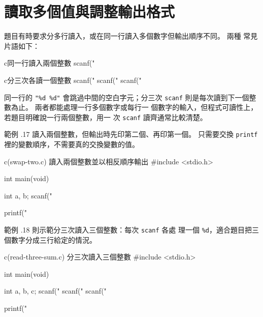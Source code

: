 \section{讀取多個值與調整輸出格式}
\label{sec:basic-multi-read}

題目有時要求分多行讀入，或在同一行讀入多個數字但輸出順序不同。 兩種
常見片語如下：

\begin{code}{c}{同一行讀入兩個整數}
scanf("%
\end{code}

\begin{code}{c}{分三次各讀一個整數}
scanf("%
scanf("%
scanf("%
\end{code}

同一行的 \texttt{"\%d \%d"} 會跳過中間的空白字元；分三次 \texttt{scanf}
則是每次讀到下一個整數為止。 兩者都能處理一行多個數字或每行一
個數字的輸入，但程式可讀性上，若題目明確說一行兩個整數，用一
次 \texttt{scanf} 讀齊通常比較清楚。

範例 \thechapter.17 讀入兩個整數，但輸出時先印第二個、再印第一個。 
只需要交換 \texttt{printf} 裡的變數順序，不需要真的交換變數的值。

\begin{example}{c}{(swap-two.c) 讀入兩個整數並以相反順序輸出}
#include <stdio.h>

int main(void) {
    int a, b;
    scanf("%

    printf("%
}
\end{example}


範例 \thechapter.18 則示範分三次讀入三個整數：每次 \texttt{scanf} 各處
理一個 \texttt{\%d}，適合題目把三個數字分成三行給定的情況。

\begin{example}{c}{(read-three-sum.c) 分三次讀入三個整數}
#include <stdio.h>

int main(void) {
    int a, b, c;
    scanf("%
    scanf("%
    scanf("%

    printf("%
}
\end{example}


